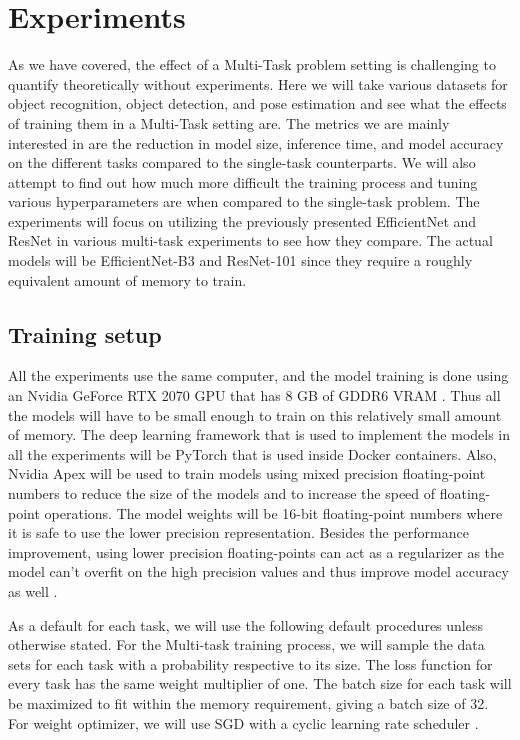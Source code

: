 \chapter{Experiments}
As we have covered, the effect of a Multi-Task problem setting is challenging to quantify theoretically without experiments.
Here we will take various datasets for object recognition, object detection, and pose estimation and see what the effects of training them in a Multi-Task setting are.
The metrics we are mainly interested in are the reduction in model size, inference time, and model accuracy on the different tasks compared to the single-task counterparts.
We will also attempt to find out how much more difficult the training process and tuning various hyperparameters are when compared to the single-task problem.
The experiments will focus on utilizing the previously presented EfficientNet and ResNet in various multi-task experiments to see how they compare.
The actual models will be EfficientNet-B3 and ResNet-101 since they require a roughly equivalent amount of memory to train.

\section{Training setup}
All the experiments use the same computer, and the model training is done using an Nvidia GeForce RTX 2070 GPU that has 8 GB of GDDR6 VRAM \citep{nvidiaRTX}.
Thus all the models will have to be small enough to train on this relatively small amount of memory.
The deep learning framework that is used to implement the models in all the experiments will be PyTorch \citep{pytorch} that is used inside Docker \citep{docker} containers.
Also, Nvidia Apex \citep{Apex} will be used to train models using mixed precision floating-point numbers to reduce the size of the models and to increase the speed of floating-point operations.
The model weights will be 16-bit floating-point numbers where it is safe to use the lower precision representation.
Besides the performance improvement, using lower precision floating-points can act as a regularizer as the model can't overfit on the high precision values and thus improve model accuracy as well \citep{mixedTraining}.

As a default for each task, we will use the following default procedures unless otherwise stated.
For the Multi-task training process, we will sample the data sets for each task with a probability respective to its size.
The loss function for every task has the same weight multiplier of one.
The batch size for each task will be maximized to fit within the memory requirement, giving a batch size of 32.
For weight optimizer, we will use SGD with a cyclic learning rate scheduler \citep{cycliclr}.

